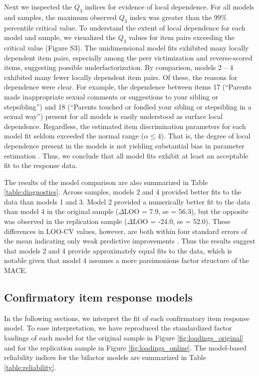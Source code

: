\documentclass[letterpaper,man,natbib]{apa6}  %
\begin{document}
Next we inspected the $Q_3$ indices for evidence of local dependence. For all models and samples, the maximum observed $Q_3$ index was greater than the 99\% percentile critical value. To understand the extent of local dependence for each model and sample, we visualized the $Q_3$ values for item pairs exceeding the critical value (Figure S3). The unidimensional model fits exhibited many locally dependent item pairs, especially among the peer victimization and reverse-scored items, suggesting possible underfactorization. By comparison, models 2 -- 4 exhibited many fewer locally dependent item pairs. Of these, the reasons for dependence were clear. For example, the dependence between items 17 (``Parents made inappropriate sexual comments or suggestions to your sibling or stepsibling'') and 18 (``Parents touched or fondled your sibling or stepsibling in a sexual way'') present for all models is easily understood as surface local dependence. Regardless, the estimated item discrimination parameters for each model fit seldom exceeded the normal range ($\alpha \leq 4$). That is, the degree of local dependence present in the models is not yielding substantial bias in parameter estimation \citep{edwards2018diagnostic}. Thus, we conclude that all model fits exhibit at least an acceptable fit to the response data.

The results of the model comparison are also summarized in Table \ref{table:diagnostics}. Across samples, models 2 and 4 provided better fits to the data than models 1 and 3. Model 2 provided a numerically better fit to the data than model 4 in the original sample ($\Delta \text{LOO}$ = 7.9, se = 56.3), but the opposite was observed in the replication sample ($\Delta \text{LOO}$ = -24.0, se = 52.0). These differences in LOO-CV values, however, are both within four standard errors of the mean indicating only weak predictive improvements \citep{vehtari2022cv}. Thus the results suggest that models 2 and 4 provide approximately equal fits to the data, which is notable given that model 4 assumes a more parsimonious factor structure of the MACE.

\subsection{Confirmatory item response models}

In the following sections, we interpret the fit of each confirmatory item response model. To ease interpretation, we have reproduced the standardized factor loadings of each model for the original sample in Figure \ref{fig:loadings_original} and for the replication sample in Figure \ref{fig:loadings_online}. The model-based reliability indices for the bifactor models are summarized in Table \ref{table:reliability}. 
\end{document}
